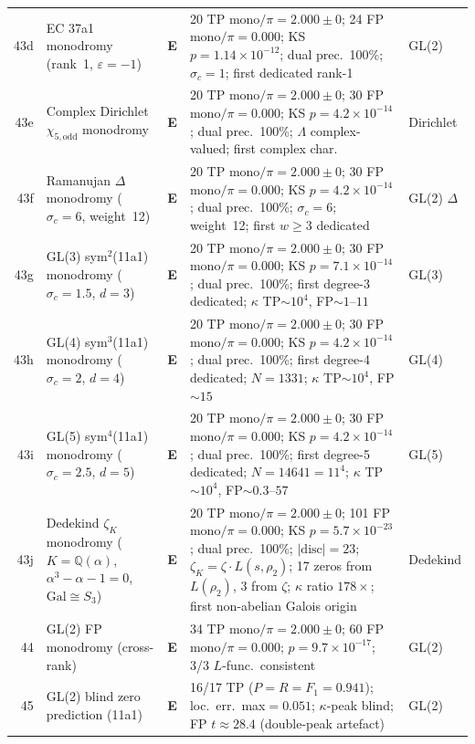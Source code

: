 \documentclass[11pt, a4paper]{article}
\theoremstyle{definition}
\theoremstyle{plain}
\begin{document}
\begin{center}
\begin{longtable}{@{}r l l p{4.2cm} l@{}}
43d & EC 37a1 monodromy (rank~1, $\varepsilon{=}{-}1$) & \textbf{E} & 20 TP mono$/\pi{=}2.000{\pm}0$; 24 FP mono$/\pi{=}0.000$; KS $p{=}1.14{\times}10^{-12}$; dual prec.\ 100\%; $\sigma_c{=}1$; first dedicated rank-1 & GL(2) \\
43e & Complex Dirichlet $\chi_{5,\mathrm{odd}}$ monodromy & \textbf{E} & 20 TP mono$/\pi{=}2.000{\pm}0$; 30 FP mono$/\pi{=}0.000$; KS $p{=}4.2{\times}10^{-14}$; dual prec.\ 100\%; $\Lambda$ complex-valued; first complex char. & Dirichlet \\
43f & Ramanujan $\Delta$ monodromy ($\sigma_c{=}6$, weight~12) & \textbf{E} & 20 TP mono$/\pi{=}2.000{\pm}0$; 30 FP mono$/\pi{=}0.000$; KS $p{=}4.2{\times}10^{-14}$; dual prec.\ 100\%; $\sigma_c{=}6$; weight~12; first $w{\geq}3$ dedicated & GL(2) $\Delta$ \\
43g & GL(3) sym$^2$(11a1) monodromy ($\sigma_c{=}1.5$, $d{=}3$) & \textbf{E} & 20 TP mono$/\pi{=}2.000{\pm}0$; 30 FP mono$/\pi{=}0.000$; KS $p{=}7.1{\times}10^{-14}$; dual prec.\ 100\%; first degree-3 dedicated; $\kappa$ TP${\sim}10^4$, FP${\sim}1$--$11$ & GL(3) \\
43h & GL(4) sym$^3$(11a1) monodromy ($\sigma_c{=}2$, $d{=}4$) & \textbf{E} & 20 TP mono$/\pi{=}2.000{\pm}0$; 30 FP mono$/\pi{=}0.000$; KS $p{=}4.2{\times}10^{-14}$; dual prec.\ 100\%; first degree-4 dedicated; $N{=}1331$; $\kappa$ TP${\sim}10^4$, FP${\sim}15$ & GL(4) \\
43i & GL(5) sym$^4$(11a1) monodromy ($\sigma_c{=}2.5$, $d{=}5$) & \textbf{E} & 20 TP mono$/\pi{=}2.000{\pm}0$; 30 FP mono$/\pi{=}0.000$; KS $p{=}4.2{\times}10^{-14}$; dual prec.\ 100\%; first degree-5 dedicated; $N{=}14641{=}11^4$; $\kappa$ TP${\sim}10^4$, FP${\sim}0.3$--$57$ & GL(5) \\
43j & Dedekind $\zeta_K$ monodromy ($K{=}\mathbb{Q}(\alpha)$, $\alpha^3{-}\alpha{-}1{=}0$, $\mathrm{Gal}{\cong}S_3$) & \textbf{E} & 20 TP mono$/\pi{=}2.000{\pm}0$; 101 FP mono$/\pi{=}0.000$; KS $p{=}5.7{\times}10^{-23}$; dual prec.\ 100\%; $|\mathrm{disc}|{=}23$; $\zeta_K{=}\zeta{\cdot}L(s{,}\rho_2)$; 17 zeros from $L(\rho_2)$, 3 from $\zeta$; $\kappa$ ratio $178\times$; first non-abelian Galois origin & Dedekind \\
44 & GL(2) FP monodromy (cross-rank) & \textbf{E} & 34 TP mono$/\pi{=}2.000{\pm}0$; 60 FP mono$/\pi{=}0.000$; $p{=}9.7{\times}10^{-17}$; 3/3 $L$-func.\ consistent & GL(2) \\
45 & GL(2) blind zero prediction (11a1) & \textbf{E} & 16/17 TP ($P{=}R{=}F_1{=}0.941$); loc.\ err.\ max${=}0.051$; $\kappa$-peak blind; FP $t{\approx}28.4$ (double-peak artefact) & GL(2) \\

\end{longtable}
\end{center}
\end{document}
